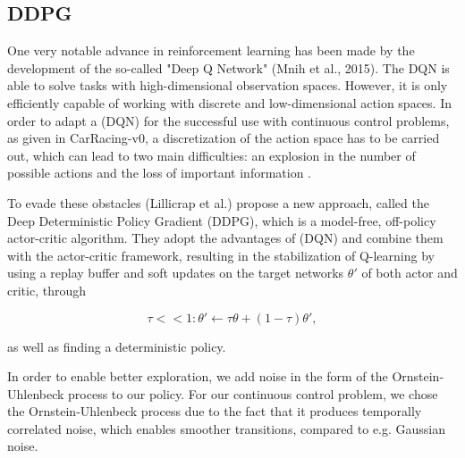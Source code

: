 \documentclass[letterpaper, 10 pt, conference]{ieeeconf}  %
\begin{document}
\subsection{DDPG}
One very notable advance in reinforcement learning has been made by the development of the so-called "Deep Q Network" (Mnih et al., 2015). The DQN is able to solve tasks with high-dimensional observation spaces. However, it is only efficiently capable of working with discrete and low-dimensional action spaces. In order to adapt a (DQN) for the successful use with continuous control problems, as given in CarRacing-v0, a discretization of the action space has to be carried out, which can lead to two main difficulties: an explosion in the number of possible actions and the loss of important information \cite{journals/corr/LillicrapHPHETS15}.

To evade these obstacles (Lillicrap et al.) propose a new approach, called the Deep Deterministic Policy Gradient (DDPG), which is a model-free, off-policy actor-critic algorithm. They adopt the advantages of (DQN) and combine them with the actor-critic framework, resulting in the stabilization of Q-learning by using a replay buffer and soft updates on the target networks $\theta'$ of both actor and critic, through

\begin{equation}
\tau << 1:\theta' \leftarrow \tau\theta + (1-\tau)\theta',
\end{equation}

as well as finding a deterministic policy.

In order to enable better exploration, we add noise in the form of the Ornstein-Uhlenbeck process to our policy. For our continuous control problem, we chose the Ornstein-Uhlenbeck process due to the fact that it produces temporally correlated noise, which enables smoother transitions, compared to e.g. Gaussian noise. 
\end{document}
